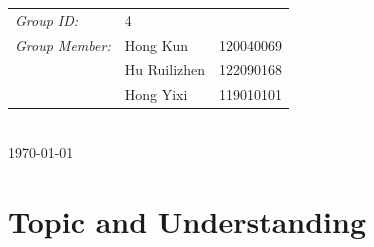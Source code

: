 \documentclass[12pt,a4paper]{report}
\begin{document}
\begin{titlepage}
    \begin{minipage}{0.6\textwidth}
        \begin{tabular}{l l l}
            \emph{Group ID:}     & 4                        \\
            \emph{Group Member:} & Hong Kun     & 120040069 \\
                                 & Hu Ruilizhen & 122090168 \\
                                 & Hong Yixi    & 119010101 \\
        \end{tabular}

    \end{minipage}\\[2cm]


    {\large \today}\\[2cm]
    \vfill
\end{titlepage}





\pagestyle{mypagestyle}


\section{Topic and Understanding}
\end{document}
